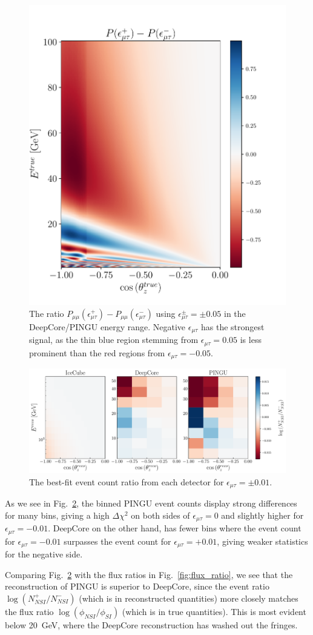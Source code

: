 \documentclass[draft=True]{revtex4-2}
\newcommand{\emt}{\ensuremath{\epsilon_{\mu\tau}}}
\begin{document}
{\begin{figure}[!tb]
\begin{center}
   \includegraphics[width=0.4\linewidth]{figures/Pmm_asymmetry.pdf}
\end{center}
\caption{The ratio $P_{\mu\mu}(\epsilon^+_{\mu\tau}) - P_{\mu\mu}(\epsilon^-_{\mu\tau})$ using  $\epsilon^\pm_{\mu\tau} = \pm 0.05$ in the DeepCore/PINGU energy range. Negative $\emt$ has the strongest signal, as the thin blue 
region stemming from $\emt = 0.05$ is less prominent than the red regions from $\emt=-0.05$.}\label{fig:Pmm_asymmetry}
\end{figure}
\begin{figure}[!tb]
   \begin{center}
      \includegraphics[width=0.4\linewidth]{figures/emt_events.pdf}
   \end{center}
   \caption{The best-fit event count ratio from each detector for $\emt = \pm 0.01$.}\label{fig:emt_events}%
 \end{figure}
As we see in Fig.~\ref{fig:emt_events}, the binned PINGU event counts display strong differences for many bins, giving a high $\Delta \chi^2$ on both sides of $\emt=0$ and slightly higher for $\emt=-0.01$. DeepCore on the other hand, 
has fewer bins where the event count for $\emt=-0.01$ surpasses the event count for $\emt=+0.01$, giving weaker statistics for the negative side.

Comparing Fig.~\ref{fig:emt_events} with the flux ratios in Fig.~\ref{fig:flux_ratio}, we see that the reconstruction of PINGU is
superior to DeepCore, since the event ratio $\log{(N^+_{NSI}/N^-_{NSI})}$ (which is in reconstructed quantities) more closely matches the flux ratio $\log{(\phi_{NSI}/\phi_{SI})}$ (which is in true quantities).
This is most evident below \SI{20}{\GeV}, where the DeepCore reconstruction has washed out the fringes.

}
\end{document}
